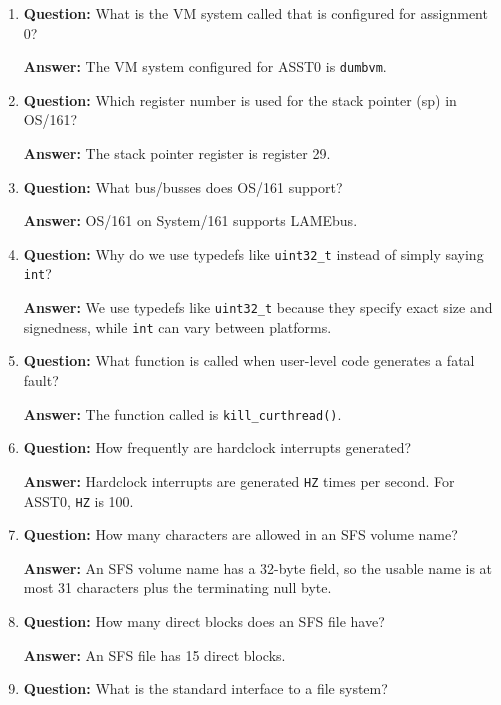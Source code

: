 \documentclass[11pt,a4paper]{article}
\begin{document}
\begin{enumerate}
    \item \textbf{Question:} What is the VM system called that is configured for assignment 0?

    \textbf{Answer:} The VM system configured for ASST0 is \texttt{dumbvm}.

    \item \textbf{Question:} Which register number is used for the stack pointer (sp) in OS/161?

    \textbf{Answer:} The stack pointer register is register 29.

    \item \textbf{Question:} What bus/busses does OS/161 support?

    \textbf{Answer:} OS/161 on System/161 supports LAMEbus.

    \item \textbf{Question:} Why do we use typedefs like \texttt{uint32\_t} instead of simply saying \texttt{int}?

    \textbf{Answer:} We use typedefs like \texttt{uint32\_t} because they specify exact size and signedness, while \texttt{int} can vary between platforms.

    \item \textbf{Question:} What function is called when user-level code generates a fatal fault?

    \textbf{Answer:} The function called is \texttt{kill\_curthread()}.

    \item \textbf{Question:} How frequently are hardclock interrupts generated?

    \textbf{Answer:} Hardclock interrupts are generated \texttt{HZ} times per second. For ASST0, \texttt{HZ} is 100.

    \item \textbf{Question:} How many characters are allowed in an SFS volume name?

    \textbf{Answer:} An SFS volume name has a 32-byte field, so the usable name is at most 31 characters plus the terminating null byte.

    \item \textbf{Question:} How many direct blocks does an SFS file have?

    \textbf{Answer:} An SFS file has 15 direct blocks.

    \item \textbf{Question:} What is the standard interface to a file system?


\end{enumerate}
\end{document}
